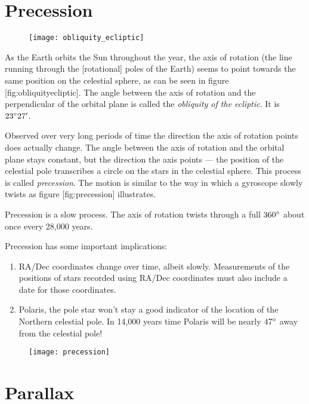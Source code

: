 \section{Precession}\label{precession}

\begin{figure}[h]
\centering\texttt{[image: obliquity\_ecliptic]}
\end{figure}

As the Earth orbits the Sun throughout the year, the axis of rotation
(the line running through the {[}rotational{]} poles of the Earth) seems
to point towards the same position on the celestial sphere, as can be
seen in figure {[}fig:obliquityecliptic{]}. The angle between the axis
of rotation and the perpendicular of the orbital plane is called the
\emph{obliquity of the ecliptic}. It is $23\degree27'$.

Observed over very long periods of time the direction the axis of
rotation points does actually change. The angle between the axis of
rotation and the orbital plane stays constant, but the direction the
axis points --- the position of the celestial pole transcribes a circle
on the stars in the celestial sphere. This process is called
\emph{precession}. The motion is similar to the way in which a gyroscope
slowly twists as figure {[}fig:precession{]} illustrates.

Precession is a slow process. The axis of rotation twists through a full
$360\degree$ about once every 28,000 years.

Precession has some important implications:

\begin{enumerate}
\item
  RA/Dec coordinates change over time, albeit slowly. Measurements of
  the positions of stars recorded using RA/Dec coordinates must also
  include a date for those coordinates.
\item
  Polaris, the pole star won't stay a good indicator of the location of
  the Northern celestial pole. In 14,000 years time Polaris will be
  nearly $47\degree$ away from the celestial pole!
\end{enumerate}

\begin{figure}[h]
\centering\texttt{[image: precession]}
\end{figure}

\section{Parallax}\label{parallax}

